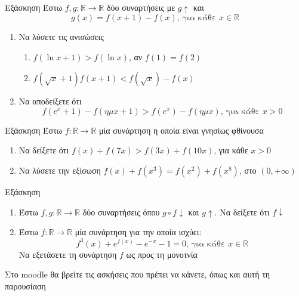 \documentclass[greek]{beamer}
\begin{document}
\begin{frame}{Εξάσκηση}
 Έστω $f,g:\mathbb{R}\to\mathbb{R}$ δύο συναρτήσεις με $g\uparrow$ και
 $$g(x)=f(x+1)-f(x)\text{, για κάθε } x\in\mathbb{R}$$
 \begin{enumerate}
  \item Να λύσετε τις ανισώσεις
        \begin{enumerate}
         \item $f(\ln x+1)>f(\ln x)$, αν $f(1)=f(2)$ \pause
         \item $f(\sqrt{x}+1)f(x+1)<f(\sqrt{x})-f(x)$ \pause
        \end{enumerate}
  \item Να αποδείξετε ότι
        $$f(e^x+1)-f(ημ x+1)>f(e^x)-f(ημ x)\text{, για κάθε } x>0$$
 \end{enumerate}
\end{frame}

\begin{frame}{Εξάσκηση}
 Έστω $f:\mathbb{R}\to\mathbb{R}$ μία συνάρτηση η οποία είναι γνησίως φθίνουσα
 \begin{enumerate}
  \item Να δείξετε ότι $f(x)+f(7x)>f(3x)+f(10x)$, για κάθε $x>0$ \pause
  \item Να λύσετε την εξίσωση $f(x)+f(x^3)=f(x^2)+f(x^8)$, στο $(0,+\infty)$
 \end{enumerate}
\end{frame}

\begin{frame}{Εξάσκηση}

 \begin{enumerate}
  \item Έστω $f,g:\mathbb{R}\to\mathbb{R}$ δύο συναρτήσεις όπου $g\circ f \downarrow$ και $g\uparrow$. Να δείξετε ότι $f\downarrow$ \pause
  \item Έστω $f:\mathbb{R}\to\mathbb{R}$ μία συνάρτηση για την οποία ισχύει:
        $$f^3(x)+e^{f(x)}-e^{-x}-1=0\text{, για κάθε } x\in\mathbb{R}$$
        Να εξετάσετε τη συνάρτηση $f$ ως προς τη μονοτνία
 \end{enumerate}
\end{frame}

\begin{frame}
 Στο moodle θα βρείτε τις ασκήσεις που πρέπει να κάνετε, όπως και αυτή τη παρουσίαση
\end{frame}
\end{document}
